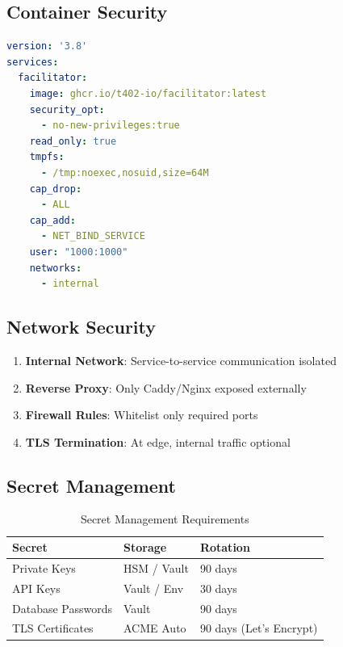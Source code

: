 \subsection{Container Security}

\begin{lstlisting}[language=yaml,caption={Docker security configuration}]
version: '3.8'
services:
  facilitator:
    image: ghcr.io/t402-io/facilitator:latest
    security_opt:
      - no-new-privileges:true
    read_only: true
    tmpfs:
      - /tmp:noexec,nosuid,size=64M
    cap_drop:
      - ALL
    cap_add:
      - NET_BIND_SERVICE
    user: "1000:1000"
    networks:
      - internal
\end{lstlisting}

\subsection{Network Security}

\begin{enumerate}
    \item \textbf{Internal Network}: Service-to-service communication isolated
    \item \textbf{Reverse Proxy}: Only Caddy/Nginx exposed externally
    \item \textbf{Firewall Rules}: Whitelist only required ports
    \item \textbf{TLS Termination}: At edge, internal traffic optional
\end{enumerate}

\subsection{Secret Management}

\begin{table}[htbp]
\centering
\caption{Secret Management Requirements}
\label{tab:secrets}
\begin{tabular}{lll}
\toprule
\textbf{Secret} & \textbf{Storage} & \textbf{Rotation} \\
\midrule
Private Keys & HSM / Vault & 90 days \\
API Keys & Vault / Env & 30 days \\
Database Passwords & Vault & 90 days \\
TLS Certificates & ACME Auto & 90 days (Let's Encrypt) \\
\bottomrule
\end{tabular}
\end{table}

